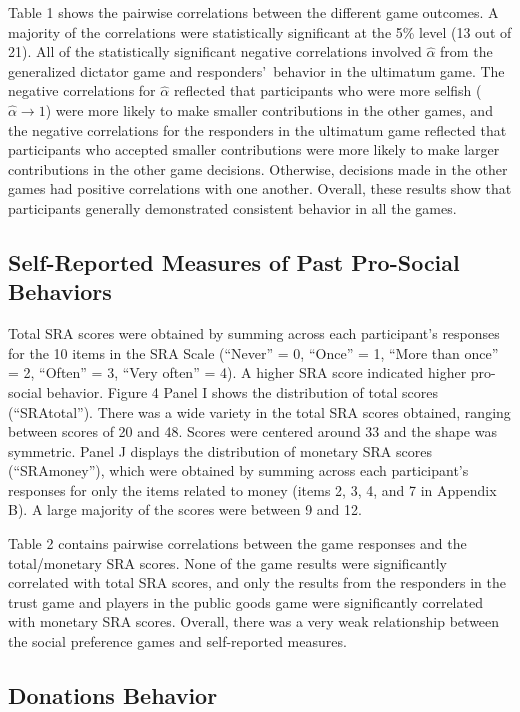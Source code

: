 \documentclass[12pt]{article}
\begin{document}
Table 1 shows the pairwise correlations between the different game outcomes. A majority of the correlations were statistically significant at the 5\% level (13 out of 21). All of the statistically significant negative correlations involved \(\hat{\alpha}\) from the generalized dictator game and responders\rq \ behavior in the ultimatum game. The negative correlations for \(\hat{\alpha}\) reflected that participants who were more selfish (\(\hat{\alpha} \rightarrow 1\)) were more likely to make smaller contributions in the other games, and the negative correlations for the responders in the ultimatum game reflected that participants who accepted smaller contributions were more likely to make larger contributions in the other game decisions. Otherwise, decisions made in the other games had positive correlations with one another. Overall, these results show that participants generally demonstrated consistent behavior in all the games.

\subsection{Self-Reported Measures of Past Pro-Social Behaviors}

Total SRA scores were obtained by summing across each participant\rq s responses for the 10 items in the SRA Scale (``Never'' = 0, ``Once'' = 1, ``More than once'' = 2, ``Often'' = 3, ``Very often'' = 4). A higher SRA score indicated higher pro-social behavior. Figure 4 Panel I shows the distribution of total scores (``SRAtotal''). There was a wide variety in the total SRA scores obtained, ranging between scores of 20 and 48. Scores were centered around 33 and the shape was symmetric. Panel J displays the distribution of monetary SRA scores (``SRAmoney''), which were obtained by summing across each participant\rq s responses for only the items related to money (items 2, 3, 4, and 7 in Appendix B).  A large majority of the scores were between 9 and 12.

Table 2 contains pairwise correlations between the game responses and the total/monetary SRA scores. None of the game results were significantly correlated with total SRA scores, and only the results from the responders in the trust game and players in the public goods game were significantly correlated with monetary SRA scores. Overall, there was a very weak relationship between the social preference games and self-reported measures. 

\subsection{Donations Behavior}
\end{document}

